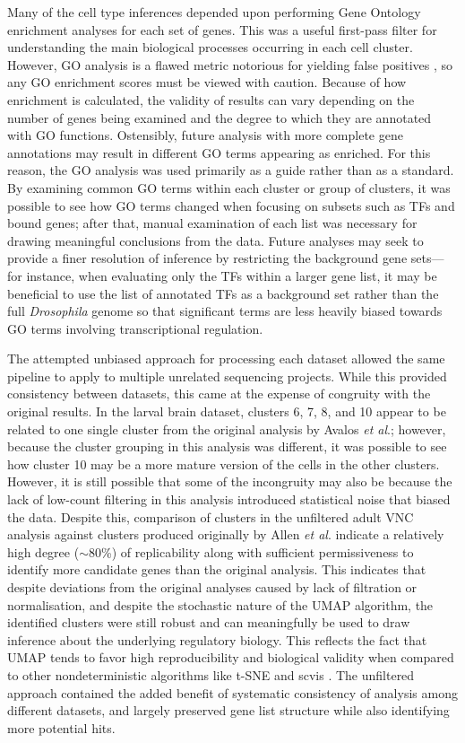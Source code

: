 \documentclass[withindex,glossary]{cam-thesis}
\begin{document}
Many of the cell type inferences depended upon performing Gene Ontology
enrichment analyses for each set of genes. This was a useful first-pass
filter for understanding the main biological processes occurring in each
cell cluster. However, GO analysis is a flawed metric notorious for
yielding false positives , so any GO enrichment
scores must be viewed with caution. Because of how enrichment is
calculated, the validity of results can vary depending on the number of
genes being examined and the degree to which they are annotated with GO
functions. Ostensibly, future analysis with more complete gene
annotations may result in different GO terms appearing as enriched. For
this reason, the GO analysis was used primarily as a guide rather than
as a standard. By examining common GO terms within each cluster or group
of clusters, it was possible to see how GO terms changed when focusing
on subsets such as TFs and bound genes; after that, manual examination
of each list was necessary for drawing meaningful conclusions from the
data. Future analyses may seek to provide a finer resolution of inference by restricting the background gene sets---for instance, when evaluating only the TFs within a larger gene list, it may be beneficial to use the list of annotated TFs as a background set rather than the full \emph{Drosophila} genome so that significant terms are less heavily biased towards GO terms involving transcriptional regulation.

The attempted unbiased approach for processing each dataset allowed the
same pipeline to apply to multiple unrelated sequencing projects. While
this provided consistency between datasets, this came at the expense of
congruity with the original results. In the larval brain dataset,
clusters 6, 7, 8, and 10 appear to be related to one single cluster from
the original analysis by Avalos \emph{et al}.; however, because the
cluster grouping in this analysis was different, it was possible to see
how cluster 10 may be a more mature version of the cells in the other
clusters. However, it is still possible that some of the incongruity may
also be because the lack of low-count filtering in this analysis
introduced statistical noise that biased the data. Despite this, comparison of clusters in the unfiltered adult VNC analysis against clusters produced originally by Allen \emph{et al}. indicate a relatively high degree ($\sim{}$80\%) of replicability along with sufficient permissiveness to identify more candidate genes than the original analysis. This indicates that despite deviations from the original analyses caused by lack of filtration or normalisation, and despite the stochastic nature of the UMAP algorithm, the identified clusters were still robust and can meaningfully be used to draw inference about the underlying regulatory biology. This reflects the fact that UMAP tends to favor high reproducibility and biological validity when compared to other nondeterministic algorithms like t-SNE and scvis . The unfiltered approach contained the added benefit of systematic consistency of analysis among different datasets, and largely preserved gene list structure while also identifying more potential hits.
\end{document}

